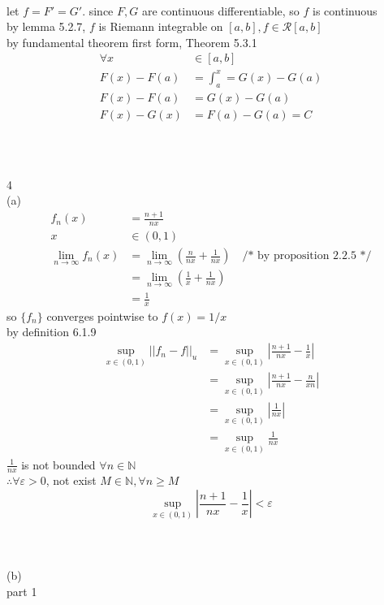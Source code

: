 \documentclass[12pt, border = 4pt, multi]{article} %
\begin{document}
\newpage
{}\\
let $f = F' = G'$. since $F, G$ are continuous differentiable, so $f$ is continuous\\
by lemma 5.2.7, $f$ is Riemann integrable on $[a, b], f \in \mathscr{R}[a, b]$\\
by fundamental theorem first form, Theorem 5.3.1
\begin{align*}
\forall x &\in [a, b]\\
F(x) - F(a) &= \int_a ^ x = G(x) - G(a)\\
F(x) - F(a) &= G(x) - G(a)\\
F(x) - G(x) &= F(a) - G(a) = C\\
\end{align*}
\\
\\
\\
4\\
(a)\\
\begin{align*}
f_n(x) &= \frac{n + 1}{nx}\\
x &\in (0, 1)\\
\lim_{n \rightarrow \infty} f_n(x) &= \lim_{n \rightarrow \infty} \left(\frac{n}{nx} + \frac{1}{nx}\right) \quad \text{/* by proposition 2.2.5 */}\\
&= \lim_{n \rightarrow \infty} \left(\frac{1}{x} + \frac{1}{nx}\right)\\
&= \frac{1}{x}
\end{align*}
so $\{f_n\}$ converges pointwise to $f(x) = 1 / x$\\
by definition 6.1.9
\begin{align*}
\sup_{x \in (0, 1)}||f_n - f||_u &= \sup_{x \in (0, 1)}\left|\frac{n + 1}{nx} - \frac{1}{x}\right|\\
&= \sup_{x \in (0, 1)}\left|\frac{n + 1}{nx} - \frac{n}{xn}\right|\\
&= \sup_{x \in (0, 1)}\left|\frac{1}{nx}\right|\\
&= \sup_{x \in (0, 1)}\frac{1}{nx}
\end{align*}
$\frac{1}{nx}$ is not bounded $\forall n \in \mathbb{N}$\\
$\therefore \forall \varepsilon > 0$, not exist $M \in \mathbb{N}, \forall n \geq M$
\[\sup_{x \in (0, 1)}\left|\frac{n + 1}{nx} - \frac{1}{x}\right| < \varepsilon\]
\\
\\
\\
(b)\\
part 1\\
\end{document}
